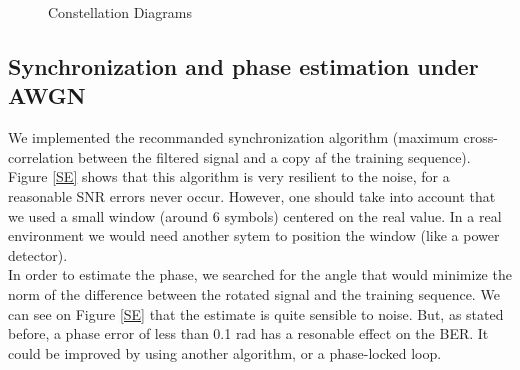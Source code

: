 \documentclass[a4paper,12pt]{article}
\begin{document}
\begin{figure}[ht]
\caption{Constellation Diagrams}
\label{Constellation}
\end{figure}


\subsection{Synchronization and phase estimation under AWGN}
We implemented the recommanded synchronization algorithm (maximum cross-correlation between the filtered signal and a copy af the training sequence). Figure \ref{SE} shows that this algorithm is very resilient to the noise, for a reasonable SNR errors never occur. However, one should take into account that we used a small window (around 6 symbols) centered on the real value. In a real environment we would need another sytem to position the window (like a power detector). \\

In order to estimate the phase, we searched for the angle that would minimize the norm of the difference between the rotated signal and the training sequence. We can see on Figure \ref{SE} that the estimate is quite sensible to noise. But, as stated before, a phase error of less than 0.1 rad has a resonable effect on the BER. It could be improved by using another algorithm, or a phase-locked loop.
\end{document}
